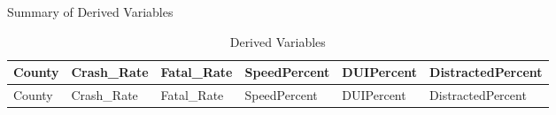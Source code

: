 \documentclass[
  ignorenonframetext,
  aspectratio=169]{beamer}
\begin{document}
\begin{frame}{Summary of Derived Variables}
\label{summary-of-derived-variables}
\begin{longtable}[]{@{}
  >{\raggedright\arraybackslash}p{}
  >{\raggedleft\arraybackslash}p{}
  >{\raggedleft\arraybackslash}p{}
  >{\raggedleft\arraybackslash}p{}
  >{\raggedleft\arraybackslash}p{}
  >{\raggedleft\arraybackslash}p{}@{}}
\caption{Derived Variables}\tabularnewline
\toprule\noalign{}
\begin{minipage}[b]{\linewidth}\raggedright
County
\end{minipage} & \begin{minipage}[b]{\linewidth}\raggedleft
Crash\_Rate
\end{minipage} & \begin{minipage}[b]{\linewidth}\raggedleft
Fatal\_Rate
\end{minipage} & \begin{minipage}[b]{\linewidth}\raggedleft
SpeedPercent
\end{minipage} & \begin{minipage}[b]{\linewidth}\raggedleft
DUIPercent
\end{minipage} & \begin{minipage}[b]{\linewidth}\raggedleft
DistractedPercent
\end{minipage} \\
\midrule\noalign{}
\endfirsthead
\toprule\noalign{}
\begin{minipage}[b]{\linewidth}\raggedright
County
\end{minipage} & \begin{minipage}[b]{\linewidth}\raggedleft
Crash\_Rate
\end{minipage} & \begin{minipage}[b]{\linewidth}\raggedleft
Fatal\_Rate
\end{minipage} & \begin{minipage}[b]{\linewidth}\raggedleft
SpeedPercent
\end{minipage} & \begin{minipage}[b]{\linewidth}\raggedleft
DUIPercent
\end{minipage} & \begin{minipage}[b]{\linewidth}\raggedleft
DistractedPercent
\end{minipage} \\

\end{longtable}
\end{frame}
\end{document}

